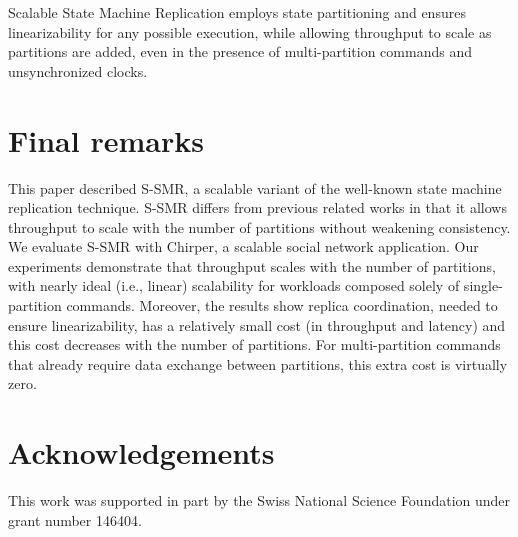 \documentclass[11pt]{article}
\begin{document}
Scalable State Machine Replication employs state partitioning and ensures linearizability for any possible execution, while allowing throughput to scale as partitions are added, even in the presence of multi-partition commands and unsynchronized clocks.


\section{Final remarks}
\label{sec:final}

This paper described S-SMR, a scalable variant of the well-known state machine replication technique.
S-SMR differs from previous related works in that it allows throughput to scale with the number of partitions without weakening consistency.
We evaluate S-SMR with Chirper, a scalable social network application.
Our experiments demonstrate that throughput scales with the number of partitions, with nearly ideal (i.e., linear) scalability for workloads composed solely of single-partition commands.
Moreover, the results show replica coordination, needed to ensure linearizability, has a relatively small cost (in throughput and latency) and this cost decreases with the number of partitions.
For multi-partition commands that already require data exchange between partitions, this extra cost is virtually zero.

\section*{Acknowledgements}
\label{sec:acknowledgements}

This work was supported in part by the Swiss National Science Foundation under grant number 146404.



\end{document}
